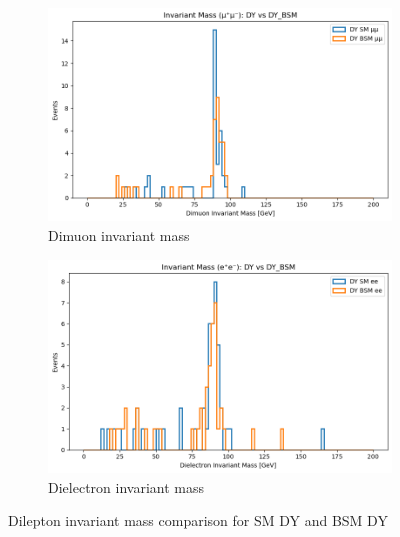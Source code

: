 \documentclass{CUP-JNL-DTM}%
\theoremstyle{definition}
\numberwithin{equation}{section}
\begin{document}
\begin{figure}[H]
    \begin{subfigure}{.5\textwidth}
      \centering
      \includegraphics[width=.85\linewidth]{img/mumu_comp.png}
      \caption{Dimuon invariant mass}
      \label{fig:mumu}
    \end{subfigure}%
    \begin{subfigure}{.5\textwidth}
      \centering
      \includegraphics[width=.85\linewidth]{img/ee_comp.png}
      \caption{Dielectron invariant mass}
      \label{fig:ee}
    \end{subfigure}
    \caption{Dilepton invariant mass comparison for SM DY and BSM DY} 
    \label{fig:imass}
\end{figure}
\end{document}
